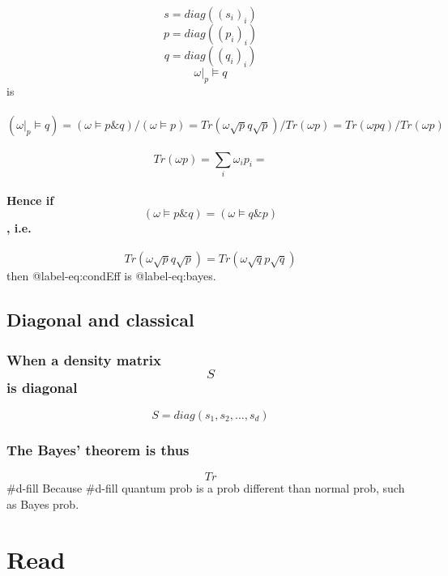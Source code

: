 \[s = diag((s_i)_i)\] \[p = diag((p_i)_i)\] \[q = diag((q_i)_i)\]
\[\omega|_p \vDash q\] is

\hypertarget{omega_p-vdash-q-omega-vdash-p-q-omega-vdash-p-tromega-sqrt-p-q-sqrt-ptromega-p-tromega-p-qtromega-p}{%
\paragraph{\texorpdfstring{\[(\omega|_p \vDash q) = (\omega \vDash p \& q) / (\omega \vDash p) = Tr(\omega \sqrt p q \sqrt p)/Tr(\omega p)= Tr(\omega  p q)/Tr(\omega p) \]}{(\textbackslash{}omega\textbar{}\_p \textbackslash{}vDash q) = (\textbackslash{}omega \textbackslash{}vDash p \textbackslash{}\& q) / (\textbackslash{}omega \textbackslash{}vDash p) = Tr(\textbackslash{}omega \textbackslash{}sqrt p q \textbackslash{}sqrt p)/Tr(\textbackslash{}omega p)= Tr(\textbackslash{}omega  p q)/Tr(\textbackslash{}omega p) }}\label{omega_p-vdash-q-omega-vdash-p-q-omega-vdash-p-tromega-sqrt-p-q-sqrt-ptromega-p-tromega-p-qtromega-p}}

\[Tr(\omega p) = \sum_i \omega_i p_i = \]

\hypertarget{hence-if-omega-vdash-p-q-omega-vdash-q-p-i.e.}{%
\paragraph{\texorpdfstring{Hence if
\[ (\omega \vDash p \& q) = (\omega \vDash q \& p)\],
i.e.}{Hence if  (\textbackslash{}omega \textbackslash{}vDash p \textbackslash{}\& q) = (\textbackslash{}omega \textbackslash{}vDash q \textbackslash{}\& p), i.e.}}\label{hence-if-omega-vdash-p-q-omega-vdash-q-p-i.e.}}

\[Tr(\omega \sqrt{p}q\sqrt{p}) = Tr(\omega \sqrt{q}p\sqrt{q})\] then
@label-eq:condEff is @label-eq:bayes.

\hypertarget{diagonal-and-classical}{%
\subsection{Diagonal and classical}\label{diagonal-and-classical}}

\hypertarget{when-a-density-matrix-s-is-diagonal}{%
\subsubsection{\texorpdfstring{When a density matrix \[S\] is
diagonal}{When a density matrix S is diagonal}}\label{when-a-density-matrix-s-is-diagonal}}

\[S = diag(s_1,s_2,...,s_d)\]

\hypertarget{the-bayes-theorem-is-thus}{%
\subsubsection{The Bayes' theorem is
thus}\label{the-bayes-theorem-is-thus}}

\[Tr\] \#d-fill Because \#d-fill quantum prob is a prob different than
normal prob, such as Bayes prob.

\hypertarget{read}{%
\section{Read}\label{read}}
